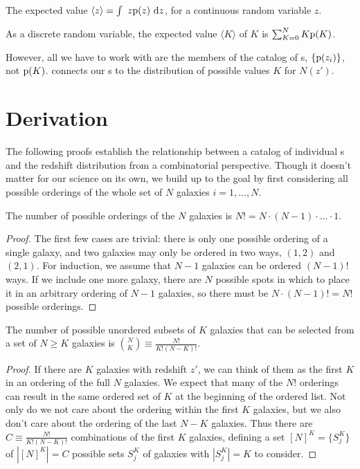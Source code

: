 \begin{definition}\label{def:expected}
	The expected value $\langle z \rangle = \int\ z \mathrm{p}(z)\ \mathrm{d} z$, for a continuous random variable $z$.
\end{definition}

\begin{example}\label{exe:expectednz}
	As a discrete random variable, the expected value $\langle K \rangle$ of $K$ is $\sum_{K = 0}^{N} K \mathrm{p}(K)$.
\end{example}

However, all we have to work with are the members of the catalog of \pzpdf s, $\{\mathrm{p}(z_{i})\}$, not $\mathrm{p}(K)$.
 connects our \pzpdf s to the distribution of possible values $K$ for $N(z')$.

\section{Derivation}

The following proofs establish the relationship between a catalog of individual \pzpdf s and the redshift distribution from a combinatorial perspective.
Though it doesn't matter for our science on its own, we build up to the goal by first considering all possible orderings of the whole set of $N$ galaxies $i = 1, \dots, N$.

\begin{lemma}\label{lem:permutations}
	The number of possible orderings of the $N$ galaxies is $N! = N \cdot (N - 1) \cdot \dots \cdot 1$.
\end{lemma}
\begin{proof}
	The first few cases are trivial: there is only one possible ordering of a single galaxy, and two galaxies may only be ordered in two ways, $(1, 2)$ and $(2, 1)$.
	For induction, we assume that $N - 1$ galaxies can be ordered $(N - 1)!$ ways.
	If we include one more galaxy, there are $N$ possible spots in which to place it in an arbitrary ordering of $N - 1$ galaxies, so there must be $N \cdot (N - 1)! = N!$ possible orderings.
\end{proof}

\begin{lemma}\label{lem:combinations}
	The number of possible unordered subsets of $K$ galaxies that can be selected from a set of $N \geq K$ galaxies is $\binom{N}{K} \equiv \frac{N!}{K! (N - K)!}$.
\end{lemma}
\begin{proof}
	If there are $K$ galaxies with redshift $z'$, we can think of them as the first $K$ in an ordering of the full $N$ galaxies.
	We expect that many of the $N!$ orderings can result in the same ordered set of $K$ at the beginning of the ordered list.
	Not only do we not care about the ordering within the first $K$ galaxies, but we also don't care about the ordering of the last $N - K$ galaxies.
	Thus there are $C \equiv \frac{N!}{K! (N - K)!}$ combinations of the first $K$ galaxies, defining a set $[N]^{K} = \{S^{K}_{j}\}$ of $|[N]^{K}| = C$ possible sets $S^{K}_{j}$ of galaxies with $|S^{K}_{j}| = K$ to consider.
\end{proof}

